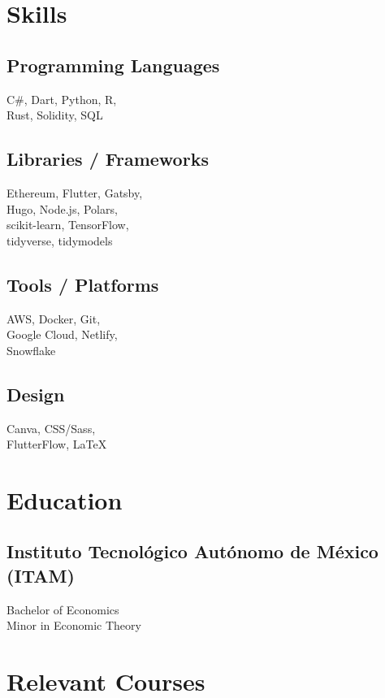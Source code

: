\documentclass[]{resume}
\begin{document}
\begin{minipage}[t]{0.25\textwidth} 


\section{Skills}
\subsection{Programming Languages}
\sectionsep
C\#,
Dart,
Python,
R, \\
Rust,
Solidity,
SQL
\sectionsep
\sectionsep
\subsection{Libraries / Frameworks}
\sectionsep
Ethereum,
Flutter,
Gatsby, \\
Hugo,
Node.js,
Polars, \\
scikit-learn,
TensorFlow, \\
tidyverse,
tidymodels
\sectionsep
\sectionsep
\subsection{Tools / Platforms}
AWS,
Docker,
Git, \\
Google Cloud,
Netlify, \\
Snowflake
\sectionsep
\sectionsep
\subsection{Design}
Canva,
CSS/Sass, \\
FlutterFlow,
LaTeX
\sectionsep
\sectionsep


\section{Education} 
\subsection{Instituto Tecnológico Autónomo de México (ITAM)}
\sectionsep
Bachelor of Economics \\
Minor in Economic Theory \\
\sectionsep
\sectionsep


\section{Relevant Courses} 

\end{minipage}
\end{document}
